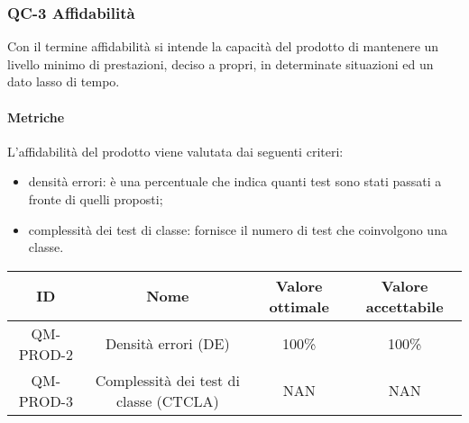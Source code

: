 \subsubsection{QC-3 Affidabilità}
Con il termine affidabilità si intende la capacità del prodotto di mantenere un livello minimo di prestazioni, deciso a propri, in determinate situazioni ed un dato lasso di tempo.

	\paragraph{Metriche}
	L'affidabilità del prodotto viene valutata dai seguenti criteri:
	\begin{itemize}
		\item densità errori: è una percentuale che indica quanti test sono stati passati a fronte di quelli proposti;
		\item complessità dei test di classe: fornisce il numero di test che coinvolgono una classe.
	\end{itemize}
	\begin{center}
		\begin{tabular}{|c|c|c|c|}
			\rowcolor{lighter-grayer}
			\hline
			ID & Nome & Valore ottimale & Valore accettabile \\
			\hline
			QM-PROD-2 & Densità errori (DE) & 100\% & 100\% \\
			\hline
			QM-PROD-3 & Complessità dei test di classe (CTCLA) & NAN & NAN \\
			\hline
		\end{tabular}
	\end{center}
